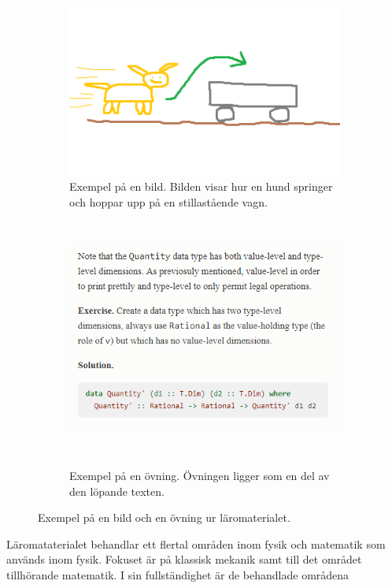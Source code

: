 \begin{draft}
\begin{figure}[tph]
    \centering
    \begin{subfigure}[t]{0.5\textwidth}
        \centering
        \includegraphics[width=0.9\linewidth]{figure/smakprov_bild_laromaterial.png}
        \caption{Exempel på en bild. Bilden visar hur en hund springer och hoppar upp på en stillastående vagn.}
        \label{fig:smakprov_bild_laromaterial}
    \end{subfigure}%
    ~~~
    \begin{subfigure}[t]{0.5\textwidth}
        \centering
        \includegraphics[width=0.9\linewidth]{figure/smakprov_ovning.png}
        \caption{Exempel på en övning. Övningen ligger som en del av den löpande texten.}~
        \label{fig:smakprov_ovning}
    \end{subfigure}
    \caption{Exempel på en bild och en övning ur läromaterialet.} 
\end{figure}

Läromataterialet behandlar ett flertal områden inom fysik och matematik som används inom fysik. Fokuset är på klassisk mekanik samt till det området tillhörande matematik. I sin fullständighet är de behandlade områdena


\end{draft}
